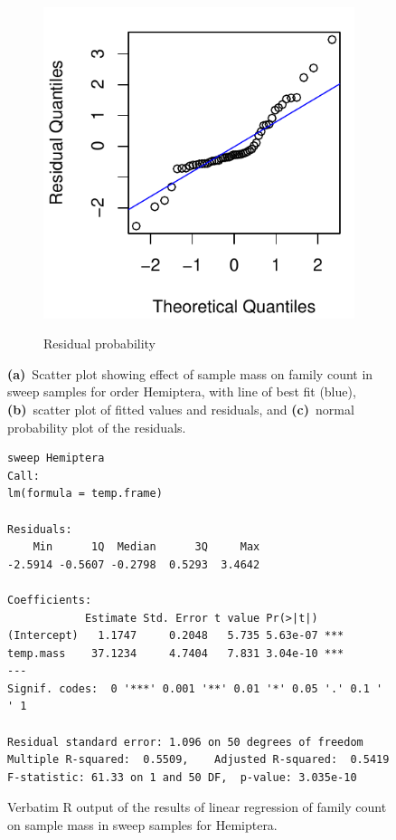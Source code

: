 \documentclass[10pt,letterpaper,twocolumn]{article}
\begin{document}
\begin{figure}[h]
\begin{subfigure}[b]{0.15\textwidth}
		\label{fig:sweep_hemiptera_resid}
	\end{subfigure}
	~
	\begin{subfigure}[b]{0.15\textwidth}
		\caption{Residual probability}
		\includegraphics[width=\textwidth]{plots/mass-vs-count/qqplot/2015_sweep_Hemiptera_qqplot.pdf}
		\label{fig:sweep_hemiptera_qqplot}
	\end{subfigure}
	\caption{\textbf{(a)}~Scatter plot showing effect of sample mass on family count in sweep samples for order Hemiptera, with line of best fit (blue), \textbf{(b)}~scatter plot of fitted values and residuals, and \textbf{(c)}~normal probability plot of the residuals.}
	\label{fig:sweep_hemiptera}
	\smallskip
	\nointerlineskip
	\hrulefill
\end{figure}

\begin{figure}[h]
	\lstset{numbers=left}
	\lstset{xleftmargin=5mm,framexleftmargin=5mm}
	\begin{lstlisting}
sweep Hemiptera
Call:
lm(formula = temp.frame)

Residuals:
    Min      1Q  Median      3Q     Max 
-2.5914 -0.5607 -0.2798  0.5293  3.4642 

Coefficients:
            Estimate Std. Error t value Pr(>|t|)    
(Intercept)   1.1747     0.2048   5.735 5.63e-07 ***
temp.mass    37.1234     4.7404   7.831 3.04e-10 ***
---
Signif. codes:  0 '***' 0.001 '**' 0.01 '*' 0.05 '.' 0.1 ' ' 1

Residual standard error: 1.096 on 50 degrees of freedom
Multiple R-squared:  0.5509,	Adjusted R-squared:  0.5419 
F-statistic: 61.33 on 1 and 50 DF,  p-value: 3.035e-10
	\end{lstlisting}
	\caption{Verbatim R output of the results of linear regression of family count on sample mass in sweep samples for Hemiptera.}
	\label{fig:sweep_hemiptera_regression}
	\smallskip
	\nointerlineskip
	\hrulefill
\end{figure}
\end{document}
